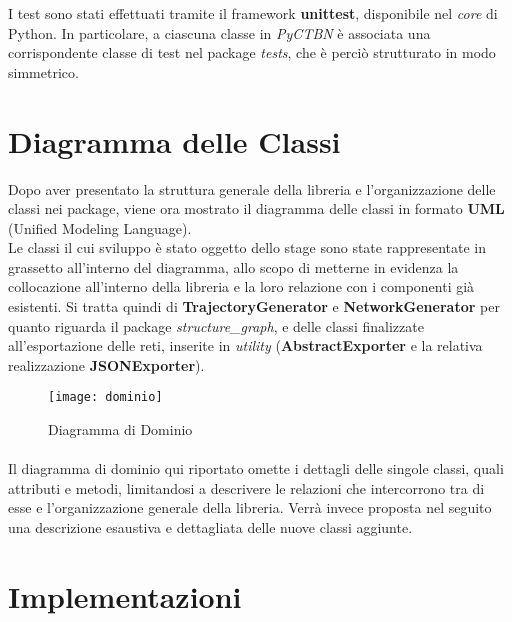   I test sono stati effettuati tramite il framework \textbf{unittest}, disponibile nel \textit{core}
  di Python. In particolare, a ciascuna classe in \textit{PyCTBN} è associata una corrispondente classe di test
  nel package \textit{tests}, che è perciò strutturato in modo simmetrico.

  \section{Diagramma delle Classi}
  Dopo aver presentato la struttura generale della libreria e l'organizzazione delle classi nei package,
  viene ora mostrato il diagramma delle classi in formato \textbf{UML} (Unified Modeling Language).\\
  Le classi il cui sviluppo è stato oggetto dello stage sono state rappresentate in grassetto all'interno del diagramma,
  allo scopo di metterne in evidenza la collocazione all'interno della libreria e la loro relazione con i 
  componenti già esistenti.
  Si tratta quindi di \textbf{TrajectoryGenerator} e \textbf{NetworkGenerator} per quanto riguarda
  il package \textit{structure\_graph}, e delle classi finalizzate all'esportazione delle reti,
  inserite in \textit{utility} (\textbf{AbstractExporter} e la relativa realizzazione \textbf{JSONExporter}).
    
  \begin{figure}[H]
    \texttt{[image: dominio]}
    \centering
    \caption{Diagramma di Dominio}
  \end{figure}

  \paragraph{}
  Il diagramma di dominio qui riportato omette i dettagli delle singole classi, quali attributi e metodi,
  limitandosi a descrivere le relazioni che intercorrono tra di esse e l'organizzazione generale della libreria.
  Verrà invece proposta nel seguito una descrizione esaustiva e dettagliata delle nuove classi aggiunte. 

  \newpage
  \section{Implementazioni}
